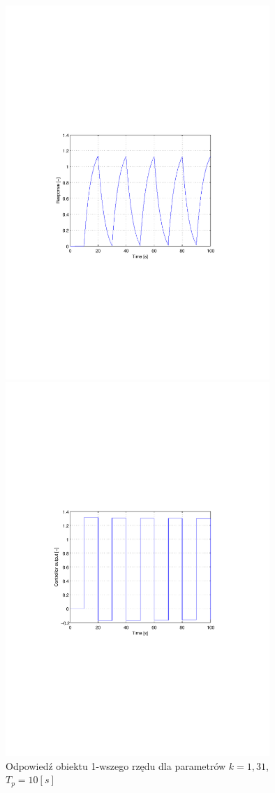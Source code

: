 \documentclass[12pt]{article}
\begin{document}
\newpage

\begin{figure}[!htb]
	\begin{center}
		\includegraphics[trim=5cm 9cm 5cm 9cm,width=10cm]{../res/img/d1_10_1,31y.pdf} 
	\end{center}
	
	\begin{center}
		\includegraphics[trim=5cm 9cm 5cm 9cm,width=10cm]{../res/img/d1_10_1,31u.pdf} 
	\end{center}
	\caption{Odpowiedź obiektu 1-wszego rzędu dla parametrów $k=1,31$,
	$T_p=10[s]$}
\end{figure}
\end{document}
